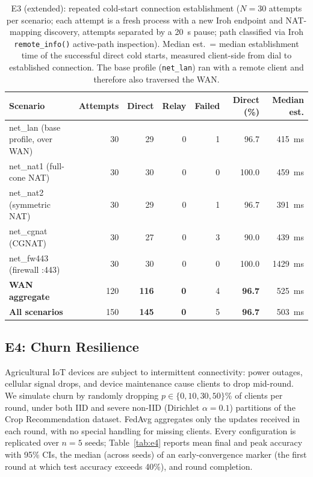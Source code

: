 ﻿\documentclass[journal]{IEEEtran}
\begin{document}
\begin{table}[t]
\centering
\caption{E3 (extended): repeated cold-start connection establishment ($N{=}30$ attempts per scenario; each attempt is a fresh process with a new Iroh endpoint and NAT-mapping discovery, attempts separated by a 20~s pause; path classified via Iroh \texttt{remote\_info()} active-path inspection). Median est.\ = median establishment time of the successful direct cold starts, measured client-side from dial to established connection. The base profile (\texttt{net\_lan}) ran with a remote client and therefore also traversed the WAN.}
\label{tab:e3est}
\footnotesize
\begin{tabular}{l r r r r r r}
\toprule
\textbf{Scenario} & \textbf{Attempts} & \textbf{Direct} & \textbf{Relay} & \textbf{Failed} & \textbf{Direct (\%)} & \textbf{Median est.} \\
\midrule
net\_lan   (base profile, over WAN) & 30  & 29  & 0 & 1 & 96.7  & 415~ms  \\
net\_nat1  (full-cone NAT)  & 30  & 30  & 0 & 0 & 100.0 & 459~ms  \\
net\_nat2  (symmetric NAT)  & 30  & 29  & 0 & 1 & 96.7  & 391~ms  \\
net\_cgnat (CGNAT)          & 30  & 27  & 0 & 3 & 90.0  & 439~ms  \\
net\_fw443 (firewall :443)  & 30  & 30  & 0 & 0 & 100.0 & 1429~ms \\
\midrule
\textbf{WAN aggregate}      & 120 & \textbf{116} & \textbf{0} & 4 & \textbf{96.7} & 525~ms \\
\textbf{All scenarios}      & 150 & \textbf{145} & \textbf{0} & 5 & \textbf{96.7} & 503~ms \\
\bottomrule
\end{tabular}
\end{table}

\subsection{E4: Churn Resilience}
\label{sec:e4}

Agricultural IoT devices are subject to intermittent connectivity: power outages, cellular signal drops, and device maintenance cause clients to drop mid-round. We simulate churn by randomly dropping $p \in \{0, 10, 30, 50\}$\% of clients per round, under both IID and severe non-IID (Dirichlet $\alpha{=}0.1$) partitions of the Crop Recommendation dataset. FedAvg aggregates only the updates received in each round, with no special handling for missing clients. Every configuration is replicated over $n{=}5$ seeds; Table~\ref{tab:e4} reports mean final and peak accuracy with 95\% CIs, the median (across seeds) of an early-convergence marker (the first round at which test accuracy exceeds 40\%), and round completion.
\end{document}
